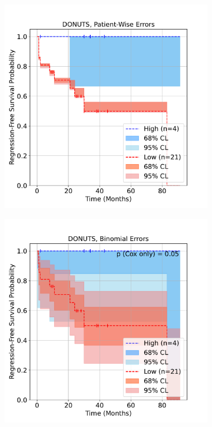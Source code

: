 \documentclass[article]{jss}
\begin{document}
\begin{figure}[ht]
\begin{subfigure}[t]{\figwidth}
    \caption{\label{fig:lung-dataset-donuts}}
  \end{subfigure}
  \vspace{\spacebetweenrows}
  \begin{subfigure}[t]{\figwidth}
    \centering
    \includegraphics[width=\linewidth]{lung_donuts_km_RFS_patient_wise.pdf}
    \caption{\label{fig:lung-dataset-donuts-patient-wise}}
  \end{subfigure}
  \vspace{\spacebetweenrows}
  \begin{subfigure}[t]{\figwidth}
    \centering
    \includegraphics[width=\linewidth]{lung_donuts_km_RFS_binomial.pdf}

\end{subfigure}
\end{figure}
\end{document}

